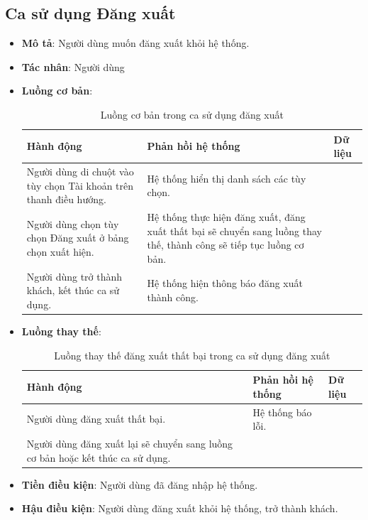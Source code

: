 \documentclass[./../main.tex]{subfiles}
\begin{document}
\subsection{Ca sử dụng Đăng xuất}
\begin{itemize}
    \item \textbf{Mô tả}: Người dùng muốn đăng xuất khỏi hệ thống.
    \item \textbf{Tác nhân}: Người dùng
    \item \textbf{Luồng cơ bản}:
    \begin{table}[H]
    \caption{\label{uc-14}Luồng cơ bản trong ca sử dụng đăng xuất}
    \begin{tabularx}{\textwidth}{| X | X | X |}
        \hline
        \textbf{Hành động} & \textbf{Phản hồi hệ thống} & \textbf{Dữ liệu} \\ \hline
        Người dùng di chuột vào tùy chọn Tài khoản trên thanh điều hướng. & Hệ thống hiển thị danh sách các tùy chọn. &
        \\ \hline
        Người dùng chọn tùy chọn Đăng xuất ở bảng chọn xuất hiện. & Hệ thống thực hiện đăng xuất, đăng xuất thất bại sẽ chuyển sang luồng thay thế, thành công sẽ tiếp tục luồng cơ bản. &
        \\ \hline
        Người dùng trở thành khách, kết thúc ca sử dụng. & Hệ thống hiện thông báo đăng xuất thành công. &
        \\ \hline
    \end{tabularx}
    \end{table}    
    \item \textbf{Luồng thay thế}:
        \begin{table}[H]
        \caption{\label{uc-15}Luồng thay thế đăng xuất thất bại trong ca sử dụng đăng xuất}
        \begin{tabularx}{\textwidth}{| X | X | X |}
            \hline
            \textbf{Hành động} & \textbf{Phản hồi hệ thống} & \textbf{Dữ liệu} \\ \hline
            Người dùng đăng xuất thất bại. & Hệ thống báo lỗi. &
            \\ \hline
            Người dùng đăng xuất lại sẽ chuyển sang luồng cơ bản hoặc kết thúc ca sử dụng. &  &
            \\ \hline
        \end{tabularx}
        \end{table}  
    \item \textbf{Tiền điều kiện}: Người dùng đã đăng nhập hệ thống.
    \item \textbf{Hậu điều kiện}: Người dùng đăng xuất khỏi hệ thống, trở thành khách.
\end{itemize}
\end{document}
